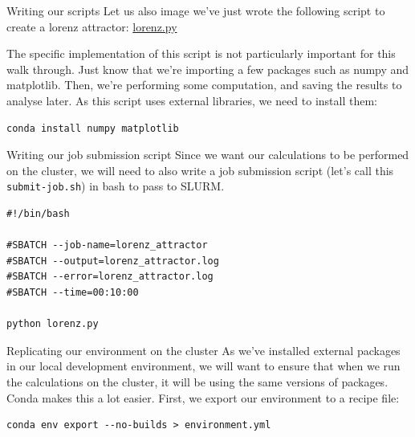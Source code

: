 \documentclass[10pt]{beamer}
\begin{document}
\begin{frame}[label={sec:org21a03cc},fragile]{Writing our scripts}
 Let us also image we've just wrote the following script to create a lorenz
attractor: \href{https://pageperso.lis-lab.fr/jay.morgan/resources/2021-programming-level-up/lectures/week-5/lorenz.py}{lorenz.py}

The specific implementation of this script is not particularly important for
this walk through. Just know that we're importing a few packages such as numpy
and matplotlib. Then, we're performing some computation, and saving the results
to analyse later. As this script uses external libraries, we need to install
them:

\begin{verbatim}
conda install numpy matplotlib
\end{verbatim}
\end{frame}

\begin{frame}[label={sec:org230dbfa},fragile]{Writing our job submission script}
 Since we want our calculations to be performed on the cluster, we will need to
also write a job submission script (let's call this \texttt{submit-job.sh}) in bash to
pass to SLURM.

\begin{verbatim}
#!/bin/bash

#SBATCH --job-name=lorenz_attractor
#SBATCH --output=lorenz_attractor.log
#SBATCH --error=lorenz_attractor.log
#SBATCH --time=00:10:00

python lorenz.py
\end{verbatim}
\end{frame}

\begin{frame}[label={sec:org7bc1c77},fragile]{Replicating our environment on the cluster}
 As we've installed external packages in our local development environment, we
will want to ensure that when we run the calculations on the cluster, it will be
using the same versions of packages. Conda makes this a lot easier. First, we
export our environment to a recipe file:

\begin{verbatim}
conda env export --no-builds > environment.yml
\end{verbatim}
\end{frame}
\end{document}
